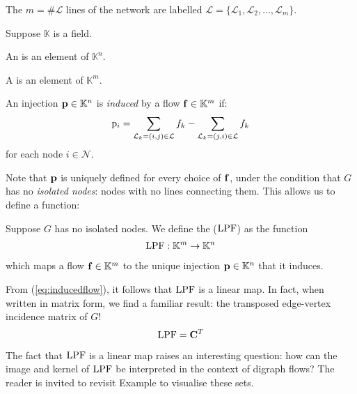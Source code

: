 \documentclass[main.tex]{subfiles}
\begin{document}
The $m = \# \mathcal{L}$ lines of the network are labelled $\mathcal{L}=\{\mathcal{L}_1,\mathcal{L}_2,\dots,\mathcal{L}_m\}$.

Suppose $\mathbb{K}$ is a field.

\begin{definition}
An  is an element of $\mathbb{K}^n$.
\end{definition}
\begin{definition}
A  is an element of $\mathbb{K}^m$.
\end{definition}



\begin{definition}\label{def:inducedinjection}
An injection $\mathbf{p} \in \mathbb{K}^n$ is \emph{induced} by a flow $\mathbf{f} \in \mathbb{K}^m$ if:
\begin{gather}
    {\mathrm{p}}_i =
    \sum_{\mathcal{L}_k=(i,j) \in \mathcal{L}} f_k -
    \sum_{\mathcal{L}_k=(j,i) \in \mathcal{L}} f_k \label{eq:inducedflow}
\end{gather}
for each node $i \in \mathcal{N}$.
\end{definition}
Note that $\mathbf{p}$ is uniquely defined for every choice of $\mathbf{f}$, under the condition that $G$ has no \emph{isolated nodes}: nodes with no lines connecting them. This allows us to define a function:
\begin{definition}
Suppose $G$ has no isolated nodes. We define the  ($\text{\textup{LPF}}$) as the function
\begin{gather*}
    \text{\textup{LPF}}: \mathbb{K}^m \rightarrow \mathbb{K}^n
\end{gather*}
which maps a flow $\mathbf{f} \in \mathbb{K}^m$ to the unique injection $\mathbf{p} \in \mathbb{K}^n$ that it induces.
\end{definition}

From (\ref{eq:inducedflow}), it follows that $\text{\textup{LPF}}$ is a linear map. In fact, when written in matrix form, we find a familiar result: the transposed edge-vertex incidence matrix of $G$!
$$\text{\textup{LPF}} = \mathbf{C}^T$$

The fact that $\text{\textup{LPF}}$ is a linear map raises an interesting question: how can the image and kernel of $\text{\textup{LPF}}$ be interpreted in the context of digraph flows?
The reader is invited to revisit Example  to visualise these sets.
\end{document}
